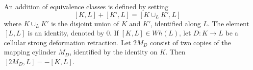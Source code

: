 An addition of equivalence classes is defined by setting
$$[K, L] + [K', L] = [K \cup_L K', L]$$
where $K \cup_L K'$ is the disjoint union of $K$ and $K'$, identified along $L$. The element $[L, L]$ is an identity, denoted by $0$. If $[K, L] \in Wh(L)$, let $D: K \rightarrow L$ be a cellular strong deformation retraction. Let $2M_D$ consist of two copies of the mapping cylinder $M_D$, identified by the identity on $K$. Then $[2M_D, L] = -[K, L]$.
